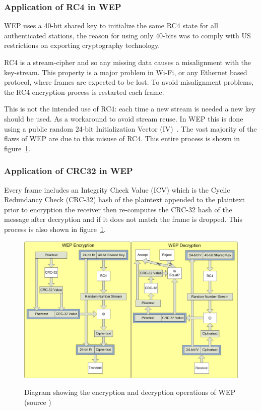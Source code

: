 \documentclass[pdftex, 11pt, a4paper]{article}
\begin{document}
\subsubsection{Application of RC4 in WEP}
WEP uses a 40-bit shared key to initialize the same RC4 state for all authenticated stations, the reason for using only 40-bits was to comply with US restrictions on exporting cryptography technology\cite{wep-evolution}.

RC4 is a stream-cipher and so any missing data causes a misalignment with the key-stream.  This property is a major problem in Wi-Fi, or any Ethernet based protocol, where frames are expected to be lost.  To avoid misalignment problems, the RC4 encryption process is restarted each frame.

This is not the intended use of RC4: each time a new stream is needed a new key should be used.  As a workaround to avoid stream reuse. In WEP this is done using a public random 24-bit Initialization Vector (IV)~\label{p:iv}.  The vast majority of the flaws of WEP are due to this misuse of RC4. This entire process is shown in figure~\ref{fig:wepop}.

\subsubsection{Application of CRC32 in WEP}
Every frame includes an Integrity Check Value (ICV) which is the Cyclic Redundancy Check (CRC-32) hash of the plaintext appended to the plaintext prior to encryption the receiver then re-computes the CRC-32 hash of the message after decryption and if it does not match the frame is dropped. This process is also shown in figure~\ref{fig:wepop}.

\begin{figure}[htb]
\center
\includegraphics[width=0.9\linewidth]{img/wepOperation}\label{fig:wepop}
\caption{Diagram showing the encryption and decryption operations of WEP (source \protect\cite{wep-evolution})}
\end{figure}
\end{document}
